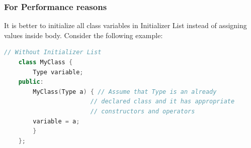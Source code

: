 \documentclass[12pt , a4paper]{article}
\begin{document}
	\subsubsection{For Performance reasons}
	It is better to initialize all class variables in Initializer List instead of assigning values inside body. Consider the following example: \\
	\begin{lstlisting}[language=C++]
	// Without Initializer List
	class MyClass {
		Type variable;
	public:
		MyClass(Type a) { // Assume that Type is an already
						// declared class and it has appropriate
						// constructors and operators
		variable = a;
		}
	};
	\end{lstlisting}
\end{document}
